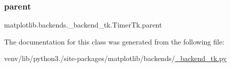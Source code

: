 \subsubsection{\texorpdfstring{parent}{parent}}
{\footnotesize\ttfamily matplotlib.\+backends.\+\_\+backend\+\_\+tk.\+Timer\+Tk.\+parent}



The documentation for this class was generated from the following file\+:\begin{DoxyCompactItemize}
\item 
venv/lib/python3./site-\/packages/matplotlib/backends/\hyperlink{__backend__tk_8py}{\+\_\+backend\+\_\+tk.\+py}\end{DoxyCompactItemize}
